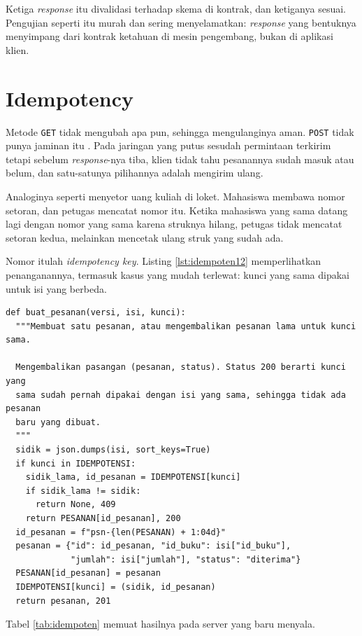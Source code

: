 Ketiga \textit{response} itu divalidasi terhadap skema di kontrak, dan ketiganya
sesuai. Pengujian seperti itu murah dan sering menyelamatkan: \textit{response} yang
bentuknya menyimpang dari kontrak ketahuan di mesin pengembang, bukan di
aplikasi klien.

\section{Idempotency}

Metode \texttt{GET} tidak mengubah apa pun, sehingga mengulanginya aman.
\texttt{POST} tidak punya jaminan itu \cite{rfc9110}. Pada jaringan yang
putus sesudah permintaan terkirim tetapi sebelum \textit{response}-nya tiba, klien tidak
tahu pesanannya sudah masuk atau belum, dan satu-satunya pilihannya adalah
mengirim ulang.

Analoginya seperti menyetor uang kuliah di loket. Mahasiswa membawa nomor
setoran, dan petugas mencatat nomor itu. Ketika mahasiswa yang sama datang
lagi dengan nomor yang sama karena struknya hilang, petugas tidak mencatat
setoran kedua, melainkan mencetak ulang struk yang sudah ada.

Nomor itulah \textit{idempotency key}. Listing \ref{lst:idempoten12}
memperlihatkan penanganannya, termasuk kasus yang mudah terlewat: kunci yang
sama dipakai untuk isi yang berbeda.

\begin{lstlisting}[style=PythonStyle, caption={Satu kunci, satu pesanan, tersedia di \berkas{sources/chapter12/aplikasi.py}}, label={lst:idempoten12}]
def buat_pesanan(versi, isi, kunci):
  """Membuat satu pesanan, atau mengembalikan pesanan lama untuk kunci sama.

  Mengembalikan pasangan (pesanan, status). Status 200 berarti kunci yang
  sama sudah pernah dipakai dengan isi yang sama, sehingga tidak ada pesanan
  baru yang dibuat.
  """
  sidik = json.dumps(isi, sort_keys=True)
  if kunci in IDEMPOTENSI:
    sidik_lama, id_pesanan = IDEMPOTENSI[kunci]
    if sidik_lama != sidik:
      return None, 409
    return PESANAN[id_pesanan], 200
  id_pesanan = f"psn-{len(PESANAN) + 1:04d}"
  pesanan = {"id": id_pesanan, "id_buku": isi["id_buku"],
             "jumlah": isi["jumlah"], "status": "diterima"}
  PESANAN[id_pesanan] = pesanan
  IDEMPOTENSI[kunci] = (sidik, id_pesanan)
  return pesanan, 201
\end{lstlisting}

Tabel \ref{tab:idempoten} memuat hasilnya pada server yang baru menyala.

